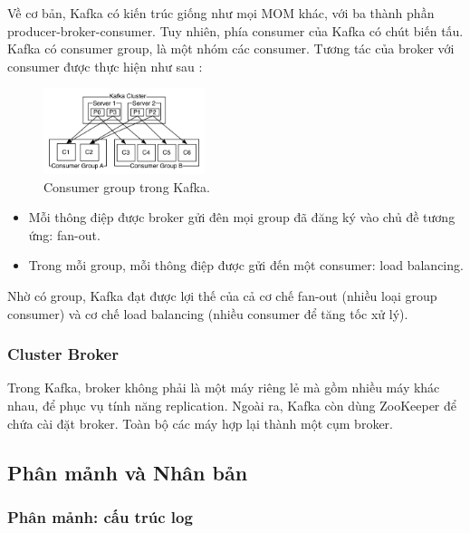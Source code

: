 \documentclass{article}
\begin{document}
Về cơ bản, Kafka có kiến trúc giống như mọi MOM khác, với ba thành phần
producer-broker-consumer. Tuy nhiên, phía consumer của Kafka có chút biến tấu.
Kafka có consumer group, là một nhóm các consumer. Tương tác của
broker với consumer được thực hiện như sau \cite{kafka_intro, kafka_detail}:

\begin{figure}
    \begin{center}
      \includegraphics[width=0.42\textwidth]{consumer_groups.png}
    \end{center}
    \caption{Consumer group trong Kafka.}
\end{figure}

\begin{itemize}
    \item Mỗi thông điệp được broker gửi đên mọi group đã đăng ký vào chủ đề
    tương ứng: fan-out.
    \item Trong mỗi group, mỗi thông điệp được gửi đến một consumer: load
    balancing.
\end{itemize}

Nhờ có group, Kafka đạt được lợi thế của cả cơ chế fan-out (nhiều loại group
consumer) và cơ chế load balancing (nhiều consumer để tăng tốc xử lý).

\subsubsection{Cluster Broker}

Trong Kafka, broker không phải là một máy riêng lẻ mà gồm nhiều máy khác nhau,
để phục vụ tính năng replication. Ngoài ra, Kafka còn dùng ZooKeeper để chứa cài
đặt broker. Toàn bộ các máy hợp lại thành một cụm broker.

\subsection{Phân mảnh và Nhân bản}

\subsubsection{Phân mảnh: cấu trúc log}
\end{document}
